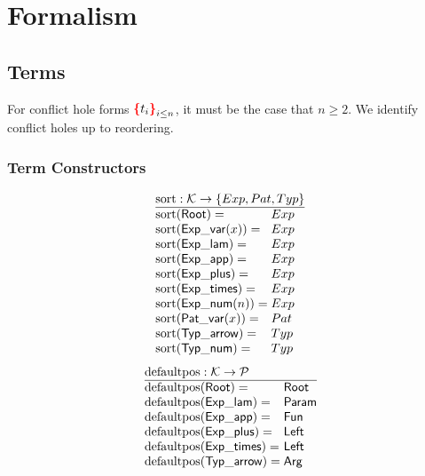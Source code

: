 \section{Formalism}


\subsection{Terms}

\figureTermSyntaxContent

For conflict hole forms $\conflictHole{t_i}_{i \leq n}$, it must be the case that $n \geq 2$.
We identify conflict holes up to reordering.


\subsubsection{Term Constructors}

\[
  \arraycolsep=0pt
  \begin{array}{ll}
    \multicolumn{2}{l}{\sortOp : \K \to \SetOf{Exp, Pat, Typ}} \\
    \hline
    \sort{\Root}={} & Exp \\
    \sort{\ExpVar(x)}={} & Exp \\
    \sort{\ExpLam}={} & Exp \\
    \sort{\ExpApp}={} & Exp \\
    \sort{\ExpPlus}={} & Exp \\
    \sort{\ExpTimes}={} & Exp \\
    \sort{\ExpNum(n)}={} & Exp \\
    \sort{\PatVar(x)}={} & Pat \\
    \sort{\TypArrow}={} & Typ \\
    \sort{\TypNum}={} & Typ \\
  \end{array}
\]
%
\figureArityContent
%
\[
  \arraycolsep=0pt
  \begin{array}{ll}
    \multicolumn{2}{l}{\defaultposOp : \K \to \P} \\
    \hline
    \defaultpos{\Root}={} & \Root \\
    \defaultpos{\ExpLam}={} & \LamParam \\
    \defaultpos{\ExpApp}={} & \AppFun \\
    \defaultpos{\ExpPlus}={} & \PlusLeft \\
    \defaultpos{\ExpTimes}={} & \TimesLeft \\
    \defaultpos{\TypArrow}={} & \ArrowArg \\
  \end{array}
\]

